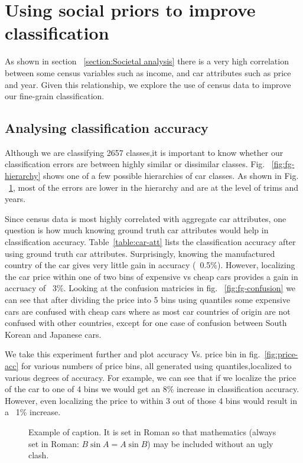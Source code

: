 \documentclass[10pt,twocolumn,letterpaper]{article}
\begin{document}
\section{Using social priors to improve classification}
As shown in section ~\ref{section:Societal analysis} there is a very high correlation between some census variables such as income, and car attributes such as price and year. Given this relationship, we explore the use of census data to improve our fine-grain classification.
\subsection{Analysing classification accuracy}
Although we are classifying 2657 classes,it is important to know whether our classification errors are between highly similar or dissimilar classes. Fig. ~\ref{fig:fg-hierarchy} shows one of a few possible hierarchies of car classes. As shown in Fig. ~\ref{fig:percent-error}, most of the errors are lower in the hierarchy and are at the level of trims and years.  

Since census data is most highly correlated with aggregate car attributes, one question is how much knowing ground truth car attributes would help in classification accuracy. Table~\ref{table:car-att} lists the classification accuracy after using ground truth car attributes. Surprisingly, knowing the manufactured country of the car gives very little gain in accuracy (~0.5\%). However, localizing the car price within one of two bins of expensive vs cheap cars provides a gain in accruacy of ~3\%. Looking at the confusion matricies in fig. ~\ref{fig:fg-confusion} we can see that after dividing the price into 5 bins using quantiles some expensive cars are confused with cheap cars where as most car countries of origin are not confused with other countries, except for one case of confusion between South Korean and Japanese cars. 

We take this experiment further and plot accuracy Vs. price bin in fig.~\ref{fig:price-acc} for various numbers of price bins, all generated using quantiles,localized to various degrees of accuracy. For example, we can see that if we localize the price of the car to one of 4 bins we would get an 8\% increase in classification accuracy. However, even localizing the price to within 3 out of those 4 bins would result in a ~1\% increase.

\begin{figure}[t]
\begin{center}
\fbox{\rule{0pt}{2in} \rule{0.9\linewidth}{0pt}}
\end{center}
   \caption{Example of caption.  It is set in Roman so that mathematics
   (always set in Roman: $B \sin A = A \sin B$) may be included without an
   ugly clash.}
\label{fig:percent-error}
\end{figure}
\end{document}
